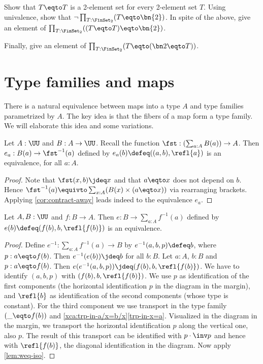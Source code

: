 \begin{xca}\label{xca:2-element-sets}
Show that $T\eqto T$ is a 2-element set for every 2-element set $T$.
Using univalence, show that $\neg\prod_{T:\FinSet_2}(T\eqto\bn{2})$.
In spite of the above, give an element of
$\prod_{T:\FinSet_2}((T\eqto T)\eqto\bn{2})$.

Finally, give an element of
$\prod_{T:\FinSet_2}(T \eqto (\bn 2\eqto T))$.
\end{xca}

\section{Type families and maps}
\label{sec:typefam}

There is a natural equivalence between maps into a type $A$
and type families parametrized by $A$. The key idea is that the
fibers of a map form a type family. We will elaborate this
idea and some variations.


\begin{lemma}\label{lem:fst-fiber(a)=B(a)}
Let $A:\UU$ and $B:A\to\UU$.
Recall the function $\fst: (\sum_{a:A} B(a))\to A$.
Then $e_a: B(a) \to \fst^{-1}(a)$ defined by
$e_a(b)\defeq ((a,b),\refl{a})$ is an equivalence,
for all $a:A$.
\end{lemma}
\begin{proof}
Note that $\fst(x,b)\jdeq x$ and that $a \eqto x$ does
not depend on $b$. Hence
$\fst^{-1}(a) \equivto \sum_{x:A}  (B(x) \times (a \eqto x))$
via rearranging brackets.
Applying \cref{cor:contract-away} leads indeed to
the equivalence $e_a$.
\end{proof}

\begin{lemma}\label{lem:sum-of-fibers}
Let $A,B:\UU$ and $f:B\to A$.
Then $e: B \to \sum_{a:A} f^{-1}(a)$ defined by
$e(b)\defeq (f(b),b,\refl{f(b)})$ is an equivalence.
\end{lemma}
\begin{proof}
Define $e^{-1}: \sum_{a:A} f^{-1}(a) \to B$ by $e^{-1}(a,b,p)\defeq b$,
where $p: a\eqto f(b)$.
Then $e^{-1}(e(b))\jdeq b$ for all $b:B$.
Let $a:A$, $b:B$ and $p: a\eqto f(b) $.
Then $e(e^{-1}(a,b,p))\jdeq (f(b),b,\refl{f(b)})$.
We have to identify $(a,b,p)$ with $(f(b),b,\refl{f(b)})$.
We use $p$ as identification of the first components
(the horizontal identification $p$ in the diagram in the margin),
and $\refl{b}$ as identification of the second components
(whose type is constant). For the third component
we use transport in the type family $(\_ \eqto f(b))$
and \cref{xca:trp-in-a/x=b/x}\ref{trp-in-x=a}. Visualized
in the diagram in the margin, we transport
the horizontal identification $p$ along the vertical one, also $p$.
The result of this transport can be identified with $p\cdot\inv p$
and hence with $\refl{f(b)}$, the diagonal identification in the diagram.
Now apply \cref{lem:weq-iso}.
\end{proof}

